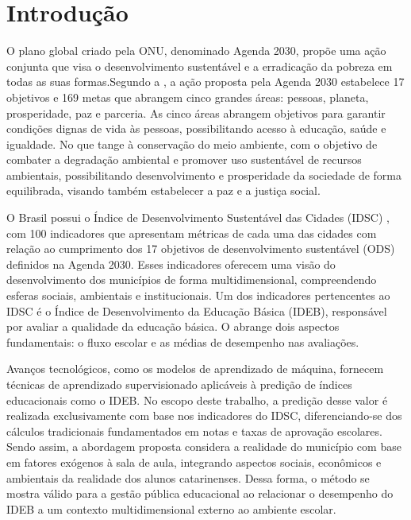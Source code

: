 \chapter{Introdução}

O plano global criado pela ONU, denominado Agenda 2030, propõe uma ação conjunta que visa o desenvolvimento sustentável e a erradicação da pobreza em todas as suas formas.Segundo a , a ação proposta pela Agenda 2030 estabelece 17 objetivos e 169 metas que abrangem cinco grandes áreas: pessoas, planeta, prosperidade, paz e parceria. As cinco áreas abrangem objetivos para garantir condições dignas de vida às pessoas, possibilitando acesso à educação, saúde e igualdade. No que tange à conservação do meio ambiente, com o objetivo de combater a degradação ambiental e promover uso sustentável de recursos ambientais, possibilitando desenvolvimento e prosperidade da sociedade de forma equilibrada, visando também estabelecer a paz e a justiça social. 

O Brasil possui o Índice de Desenvolvimento Sustentável das Cidades (IDSC) \cite{idscbr2023}, com 100 indicadores que apresentam métricas de cada uma das cidades com relação ao cumprimento dos 17 objetivos de desenvolvimento sustentável (ODS) definidos na Agenda 2030. Esses indicadores oferecem uma visão do desenvolvimento dos municípios de forma multidimensional, compreendendo esferas sociais, ambientais e institucionais. Um dos indicadores pertencentes ao IDSC é o Índice de Desenvolvimento da Educação Básica (IDEB), responsável por avaliar a qualidade da educação básica. O  abrange dois aspectos fundamentais: o fluxo escolar e as médias de desempenho nas avaliações. 

Avanços tecnológicos, como os modelos de aprendizado de máquina, fornecem técnicas de aprendizado supervisionado aplicáveis à predição de índices educacionais como o IDEB. No escopo deste trabalho, a predição desse valor é realizada exclusivamente com base nos indicadores do IDSC, diferenciando-se dos cálculos tradicionais fundamentados em notas e taxas de aprovação escolares. Sendo assim, a abordagem proposta considera a realidade do município com base em fatores exógenos à sala de aula, integrando aspectos sociais, econômicos e ambientais da realidade dos alunos catarinenses. Dessa forma, o método se mostra válido para a gestão pública educacional ao relacionar o desempenho do IDEB a um contexto multidimensional externo ao ambiente escolar.

